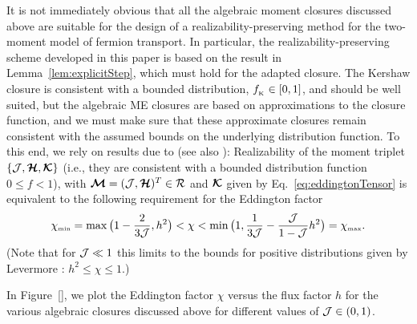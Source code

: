 It is not immediately obvious that all the algebraic moment closures discussed above are suitable for the design of a realizability-preserving method for the two-moment model of fermion transport.  
In particular, the realizability-preserving scheme developed in this paper is based on the result in Lemma~\ref{lem:explicitStep}, which must hold for the adapted closure.  
The Kershaw closure is consistent with a bounded distribution, $f_{_{\mbox{\tiny K}}}\in[0,1]$, and should be well suited, but the algebraic ME closures are based on approximations to the closure function, and we must make sure that these approximate closures remain consistent with the assumed bounds on the underlying distribution function.  
To this end, we rely on results due to \cite{levermore_1984,lareckiBanach_2011} (see also \cite{kershaw_1976,shohatTamarkin_1943}):  Realizability of the moment triplet $\{\mathcal{J},\boldsymbol{\mathcal{H}},\boldsymbol{\mathcal{K}}\}$ (i.e., they are consistent with a bounded distribution function $0 \le f<1$), with $\boldsymbol{\mathcal{M}}=(\mathcal{J},\boldsymbol{\mathcal{H}})^{T}\in\mathcal{R}$ and $\boldsymbol{\mathcal{K}}$ given by Eq.~\eqref{eq:eddingtonTensor} is equivalent to the following requirement for the Eddington factor
\begin{equation}
  \chi_{\mbox{\tiny min}}
  =\max\big(1-\frac{2}{3\mathcal{J}},h^{2}\big)
  <\chi<\min\big(1,\frac{1}{3\mathcal{J}}-\frac{\mathcal{J}}{1-\mathcal{J}}h^{2}\big)=\chi_{\mbox{\tiny max}}.  
\end{equation}
(Note that for $\mathcal{J}\ll1$ this limits to the bounds for positive distributions given by Levermore \cite{levermore_1984}: $h^{2}\le\chi\le1.$)

In Figure~\ref{}, we plot the Eddington factor $\chi$ versus the flux factor $h$ for the various algebraic closures discussed above for different values of $\mathcal{J}\in(0,1)$.  

